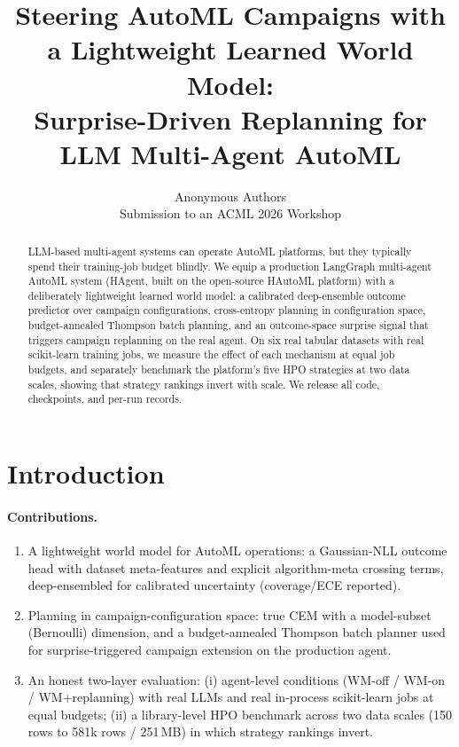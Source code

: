 \documentclass[11pt,a4paper]{article}
\title{Steering AutoML Campaigns with a Lightweight Learned World Model:\\
Surprise-Driven Replanning for LLM Multi-Agent AutoML}
\author{Anonymous Authors\\ \small Submission to an ACML 2026 Workshop}
\date{}
\begin{document}
\maketitle

\begin{abstract}
LLM-based multi-agent systems can operate AutoML platforms, but they
typically spend their training-job budget blindly. We equip a production
LangGraph multi-agent AutoML system (HAgent, built on the open-source
HAutoML platform) with a deliberately lightweight learned world model: a
calibrated deep-ensemble outcome predictor over campaign configurations,
cross-entropy planning in configuration space, budget-annealed Thompson
batch planning, and an outcome-space surprise signal that triggers
campaign replanning on the real agent. On six real tabular datasets with
real scikit-learn training jobs, we measure the effect of each mechanism
at equal job budgets, and separately benchmark the platform's five HPO
strategies at two data scales, showing that strategy rankings invert with
scale. We release all code, checkpoints, and per-run records.
\end{abstract}

\section{Introduction}
\paragraph{Contributions.}
\begin{enumerate}
  \item A lightweight world model for AutoML operations: a Gaussian-NLL
        outcome head with dataset meta-features and explicit
        algorithm-meta crossing terms, deep-ensembled for calibrated
        uncertainty (coverage/ECE reported).
  \item Planning in campaign-configuration space: true CEM with a
        model-subset (Bernoulli) dimension, and a budget-annealed Thompson
        batch planner used for surprise-triggered campaign extension on
        the production agent.
  \item An honest two-layer evaluation: (i) agent-level conditions
        (WM-off / WM-on / WM+replanning) with real LLMs and real
        in-process scikit-learn jobs at equal budgets; (ii) a
        library-level HPO benchmark across two data scales (150 rows to
        581k rows / 251\,MB) in which strategy rankings invert.
\end{enumerate}
\end{document}
